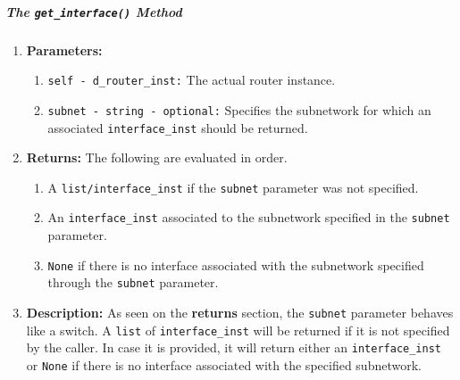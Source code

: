         \subparagraph{The \texttt{get\_interface()} Method}
            \begin{enumerate}
                \item \textbf{Parameters:}
                \begin{enumerate}
                    \item \texttt{self - d\_router\_inst:} The actual router instance.
                    \item \texttt{subnet - string - optional:} Specifies the subnetwork for which an associated \texttt{interface\_inst} should be returned.
                \end{enumerate}
                \item \textbf{Returns:} The following are evaluated in order.
                \begin{enumerate}
                    \item A \texttt{list/interface\_inst} if the \texttt{subnet} parameter was not specified.
                    \item An \texttt{interface\_inst} associated to the subnetwork specified in the \texttt{subnet} parameter.
                    \item \texttt{None} if there is no interface associated with the subnetwork specified through the \texttt{subnet} parameter.
                \end{enumerate}
                \item \textbf{Description:} As seen on the \textbf{returns} section, the \texttt{subnet} parameter behaves like a switch. A \texttt{list} of \texttt{interface\_inst} will be returned if it is not specified by the caller. In case it is provided, it will return either an \texttt{interface\_inst} or \texttt{None} if there is no interface associated with the specified subnetwork.
            \end{enumerate}

